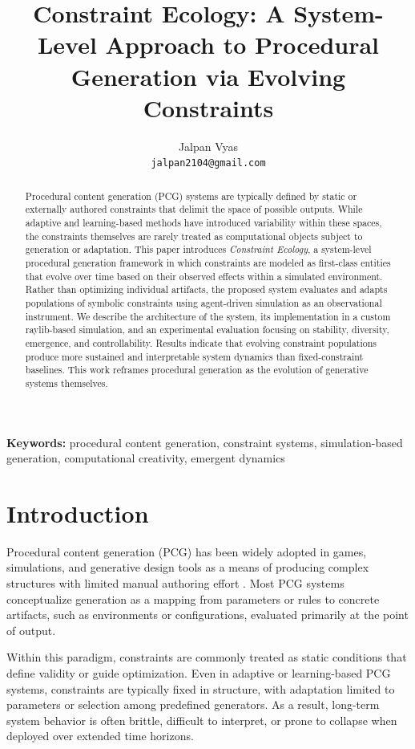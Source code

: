\documentclass[11pt]{article}
\title{Constraint Ecology: A System-Level Approach to Procedural Generation via Evolving Constraints}
\author{Jalpan Vyas \\ \texttt{jalpan2104@gmail.com}}
\date{}
\begin{document}
\maketitle

\begin{abstract}
Procedural content generation (PCG) systems are typically defined by static or externally authored constraints that delimit the space of possible outputs. While adaptive and learning-based methods have introduced variability within these spaces, the constraints themselves are rarely treated as computational objects subject to generation or adaptation. This paper introduces \emph{Constraint Ecology}, a system-level procedural generation framework in which constraints are modeled as first-class entities that evolve over time based on their observed effects within a simulated environment. Rather than optimizing individual artifacts, the proposed system evaluates and adapts populations of symbolic constraints using agent-driven simulation as an observational instrument. We describe the architecture of the system, its implementation in a custom raylib-based simulation, and an experimental evaluation focusing on stability, diversity, emergence, and controllability. Results indicate that evolving constraint populations produce more sustained and interpretable system dynamics than fixed-constraint baselines. This work reframes procedural generation as the evolution of generative systems themselves.
\end{abstract}

\noindent\textbf{Keywords:} procedural content generation, constraint systems, simulation-based generation, computational creativity, emergent dynamics

\section{Introduction}

Procedural content generation (PCG) has been widely adopted in games, simulations, and generative design tools as a means of producing complex structures with limited manual authoring effort \cite{pcg1}. Most PCG systems conceptualize generation as a mapping from parameters or rules to concrete artifacts, such as environments or configurations, evaluated primarily at the point of output.

Within this paradigm, constraints are commonly treated as static conditions that define validity or guide optimization. Even in adaptive or learning-based PCG systems, constraints are typically fixed in structure, with adaptation limited to parameters or selection among predefined generators. As a result, long-term system behavior is often brittle, difficult to interpret, or prone to collapse when deployed over extended time horizons.
\end{document}
